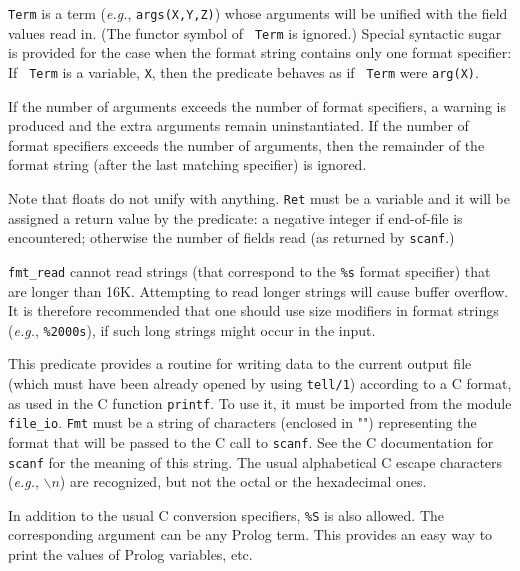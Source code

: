 \begin{description}
    {\tt Term} is a term ({\it e.g.}, {\tt args(X,Y,Z)})  whose arguments
    will be unified with the field values read in.  (The functor symbol of {\tt
    Term} is ignored.)  Special syntactic sugar is provided for the case
    when the format string contains only one format specifier: If {\tt
    Term} is a variable, {\tt X}, then the predicate behaves as if {\tt
    Term} were {\tt arg(X)}.

  If the number of arguments exceeds the number of format specifiers, a
  warning is produced and the extra arguments remain uninstantiated.
  If the number of format specifiers exceeds the number of arguments, then
  the remainder of the format string (after the last matching specifier) is
  ignored.
  
  Note that floats do not unify with anything.  {\tt Ret} must be a
  variable and it will be assigned a return value by the predicate: a
  negative integer if end-of-file is encountered; otherwise the number of
  fields read (as returned by {\tt scanf}.)
  
  {\tt fmt\_read} cannot read strings (that correspond to the {\tt \%s}
  format specifier) that are longer than 16K. Attempting to read longer
  strings will cause buffer overflow. It is therefore recommended that one
  should use size modifiers in format strings ({\it e.g.}, {\tt \%2000s}),
  if such long strings might occur in the input.

    This predicate provides a routine for writing data to
    the current output file (which must have been already opened by using
    {\tt tell/1}) according to a C format, as used in the C function
    {\tt printf}.
    To use it, it must be imported from the module {\tt file\_io}.
    {\tt Fmt} must be a string of characters (enclosed in "")
    representing the format that 
    will be passed to the C call to {\tt scanf}.  See the C
    documentation for {\tt scanf} for the meaning of this string.
    The usual alphabetical C escape characters ({\it e.g.}, $\backslash n$)
    are recognized, but not the octal or the hexadecimal ones.

    In addition to the usual C conversion specifiers, {\tt \%S} is also
    allowed. The corresponding argument can be any Prolog term. This
    provides an easy way to print the values of Prolog variables, etc.


\end{description}
